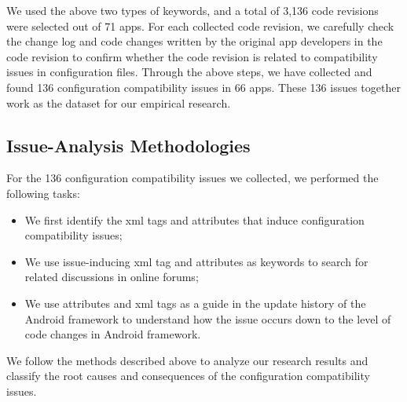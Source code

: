 We used the above two types of keywords, and a total of 3,136 code revisions were selected out of 71 apps. For each collected code revision, we carefully check the change log and code changes written by the original app developers in the code revision to confirm whether the code revision is related to compatibility issues in configuration files. Through the above steps, we have collected and found 136 configuration compatibility issues in 66 apps. These 136 issues together work as the dataset for our empirical research.


\subsection{Issue-Analysis Methodologies}

For the 136 configuration compatibility issues we collected, we performed the following tasks:
\begin{itemize}
	\item We first identify the xml tags and attributes that induce configuration compatibility issues; 
	\item We use issue-inducing xml tag and attributes as keywords to search for related discussions in online forums; 
	\item We use attributes and xml tags as a guide in the update history of the Android framework to understand how the issue occurs down to the level of code changes in Android framework.
\end{itemize}


We follow the methods described above to analyze our research results and classify the root causes and consequences of the configuration compatibility issues.

